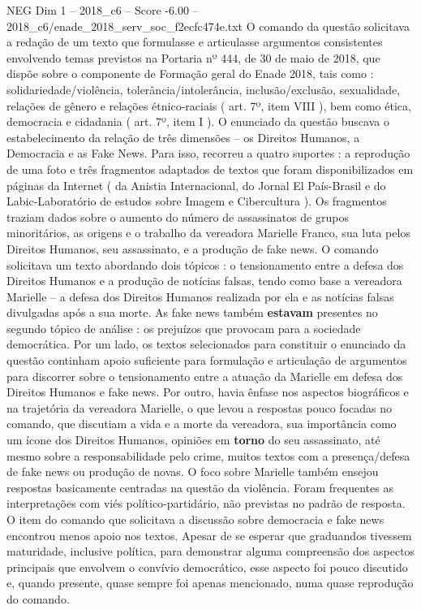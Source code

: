 \begin{textsample}{NEG Dim 1 – 2018\_c6 – Score -6.00 – 2018\_c6/enade\_2018\_serv\_soc\_f2ecfc474e.txt}
O comando da questão solicitava a redação de um texto que formulasse e articulasse argumentos consistentes envolvendo temas previstos na Portaria nº 444, de 30 de maio de 2018, que dispõe sobre o componente de Formação geral do Enade 2018, tais como : solidariedade/violência, tolerância/intolerância, inclusão/exclusão, sexualidade, relações de gênero e relações étnico-raciais ( art. 7º, item VIII ), bem como ética, democracia e cidadania ( art. 7º, item I ).
O enunciado da questão buscava o estabelecimento da relação de três dimensões – os Direitos Humanos, a Democracia e as Fake News.
Para isso, recorreu a quatro suportes : a reprodução de uma foto e três fragmentos adaptados de textos que foram disponibilizados em páginas da Internet ( da Anistia Internacional, do Jornal El País-Brasil e do Labic-Laboratório de estudos sobre Imagem e Cibercultura ).
Os fragmentos traziam dados sobre o aumento do número de assassinatos de grupos minoritários, as origens e o trabalho da vereadora Marielle Franco, sua luta pelos Direitos Humanos, seu assassinato, e a produção de fake news.
O comando solicitava um texto abordando dois tópicos : o tensionamento entre a defesa dos Direitos Humanos e a produção de notícias falsas, tendo como base a vereadora Marielle – a defesa dos Direitos Humanos realizada por ela e as notícias falsas divulgadas após a sua morte.
As fake news também \textbf{estavam} presentes no segundo tópico de análise : os prejuízos que provocam para a sociedade democrática.
Por um lado, os textos selecionados para constituir o enunciado da questão continham apoio suficiente para formulação e articulação de argumentos para discorrer sobre o tensionamento entre a atuação da Marielle em defesa dos Direitos Humanos e fake news.
Por outro, havia ênfase nos aspectos biográficos e na trajetória da vereadora Marielle, o que levou a respostas pouco focadas no comando, que discutiam a vida e a morte da vereadora, sua importância como um ícone dos Direitos Humanos, opiniões em \textbf{torno} do seu assassinato, até mesmo sobre a responsabilidade pelo crime, muitos textos com a presença/defesa de fake news ou produção de novas.
O foco sobre Marielle também ensejou respostas basicamente centradas na questão da violência.
Foram frequentes as interpretações com viés político-partidário, não previstas no padrão de resposta.
O item do comando que solicitava a discussão sobre democracia e fake news encontrou menos apoio nos textos.
Apesar de se esperar que graduandos tivessem maturidade, inclusive política, para demonstrar alguma compreensão dos aspectos principais que envolvem o convívio democrático, esse aspecto foi pouco discutido e, quando presente, quase sempre foi apenas mencionado, numa quase reprodução do comando.

\end{textsample}

